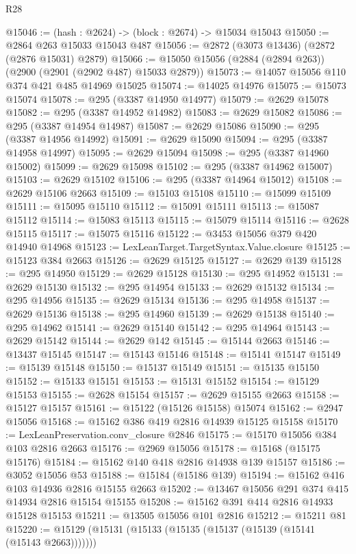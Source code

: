 \begin{lexlean}{R28}
\begin{coremodule}
@15046 := (hash : @2624) -> (block : @2674) -> @15034 @15043
@15050 := @2864 @263 @15033 @15043 @487
@15056 := @2872 (@3073 @13436) (@2872 (@2876 @15031) @2879)
@15066 := @15050 @15056 (@2884 (@2894 @263)) (@2900 (@2901 (@2902 @487) @15033 @2879))
@15073 := @14057 @15056 @110 @374 @421 @485 @14969 @15025
@15074 := @14025 @14976
@15075 := @15073 @15074
@15078 := @295 (@3387 @14950 @14977)
@15079 := @2629 @15078
@15082 := @295 (@3387 @14952 @14982)
@15083 := @2629 @15082
@15086 := @295 (@3387 @14954 @14987)
@15087 := @2629 @15086
@15090 := @295 (@3387 @14956 @14992)
@15091 := @2629 @15090
@15094 := @295 (@3387 @14958 @14997)
@15095 := @2629 @15094
@15098 := @295 (@3387 @14960 @15002)
@15099 := @2629 @15098
@15102 := @295 (@3387 @14962 @15007)
@15103 := @2629 @15102
@15106 := @295 (@3387 @14964 @15012)
@15108 := @2629 @15106 @2663
@15109 := @15103 @15108
@15110 := @15099 @15109
@15111 := @15095 @15110
@15112 := @15091 @15111
@15113 := @15087 @15112
@15114 := @15083 @15113
@15115 := @15079 @15114
@15116 := @2628 @15115
@15117 := @15075 @15116
@15122 := @3453 @15056 @379 @420 @14940 @14968
@15123 := LexLeanTarget.TargetSyntax.Value.closure
@15125 := @15123 @384 @2663
@15126 := @2629 @15125
@15127 := @2629 @139
@15128 := @295 @14950
@15129 := @2629 @15128
@15130 := @295 @14952
@15131 := @2629 @15130
@15132 := @295 @14954
@15133 := @2629 @15132
@15134 := @295 @14956
@15135 := @2629 @15134
@15136 := @295 @14958
@15137 := @2629 @15136
@15138 := @295 @14960
@15139 := @2629 @15138
@15140 := @295 @14962
@15141 := @2629 @15140
@15142 := @295 @14964
@15143 := @2629 @15142
@15144 := @2629 @142
@15145 := @15144 @2663
@15146 := @13437 @15145
@15147 := @15143 @15146
@15148 := @15141 @15147
@15149 := @15139 @15148
@15150 := @15137 @15149
@15151 := @15135 @15150
@15152 := @15133 @15151
@15153 := @15131 @15152
@15154 := @15129 @15153
@15155 := @2628 @15154
@15157 := @2629 @15155 @2663
@15158 := @15127 @15157
@15161 := @15122 (@15126 @15158) @15074
@15162 := @2947 @15056
@15168 := @15162 @386 @419 @2816 @14939 @15125 @15158
@15170 := LexLeanPreservation.conv_closure @2846
@15175 := @15170 @15056 @384 @103 @2816 @2663
@15176 := @2969 @15056
@15178 := @15168 (@15175 @15176)
@15184 := @15162 @140 @418 @2816 @14938 @139 @15157
@15186 := @3052 @15056 @53
@15188 := @15184 (@15186 @139)
@15194 := @15162 @416 @103 @14936 @2816 @15155 @2663
@15202 := @13467 @15056 @291 @374 @415 @14934 @2816 @15154 @15155
@15208 := @15162 @391 @414 @2816 @14933 @15128 @15153
@15211 := @13505 @15056 @101 @2816
@15212 := @15211 @81
@15220 := @15129 (@15131 (@15133 (@15135 (@15137 (@15139 (@15141 (@15143 @2663)))))))

\end{coremodule}
\end{lexlean}
